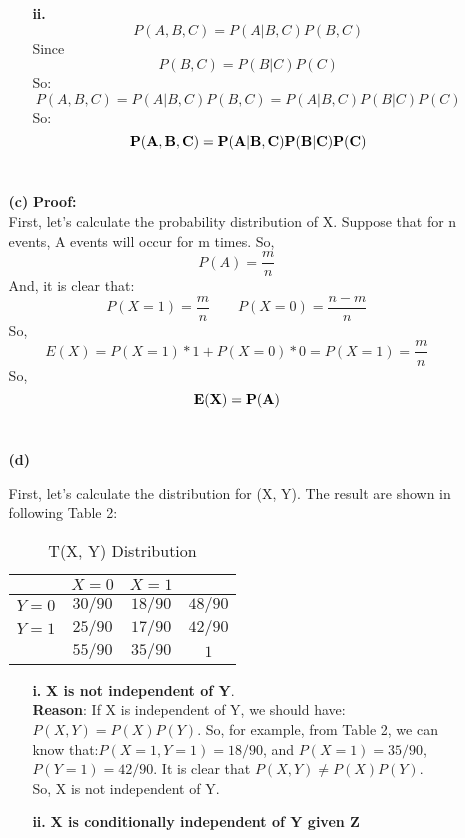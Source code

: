 \begin{enumerate}
\begin{enumerate}
\begin{enumerate}
\item[{\bf ii. }]
$$P(A, B, C) = P(A|B, C)P(B, C)$$
Since $$P(B, C) = P(B|C)P(C)$$
So: $$P(A, B, C) = P(A|B, C)P(B, C) = P(A|B, C)P(B|C)P(C)$$
So:
$${\bf P(A, B, C) = P(A|B, C)P(B|C)P(C)}$$\\

\end{enumerate}

\item[{\bf (c)}]
{\bf Proof:}\\
First, let's calculate the probability distribution of X. Suppose that for n events, A events will occur for m times. So, $$P(A) = \frac{m}{n}$$
And, it is clear that:
$$P(X=1) = \frac{m}{n} \qquad P(X=0) = \frac{n-m}{n}$$
So, $$E(X) = P(X=1)*1 + P(X=0)*0 = P(X=1) = \frac{m}{n}$$
So, $${\bf E(X) = P(A)}$$\\

\item[{\bf (d)}]

First, let's calculate the distribution for (X, Y). The result are shown in following Table 2:\\

	\begin{table}[H]
		\centering
		\begin{tabular}{|c|c|c|c|}
			\hline 
			& $X = 0$ & $X = 1$ &\\ 
			\hline 
			$Y = 0$ & $30/90$ &  $18/90$ & $48/90$ \\ 
			\hline 
			$Y = 1$ & $25/90$ &  $17/90$ & $42/90$ \\ 
			\hline 
			 & $55/90$ &  $35/90$ & $1$ \\ 
			\hline 
		\end{tabular}
		\caption{T(X, Y) Distribution \label{table:lltu}}
	\end{table}
\begin{enumerate}
\item[{\bf i. }]
{\bf X is not independent of Y}.\\

{\bf Reason}: If X is independent of Y, we should have: $P(X, Y) = P(X)P(Y)$. So, for example, from Table 2, we can know that:$P(X=1, Y=1) = 18/90$, and $P(X = 1) = 35/90$, $P(Y=1) = 42/90$. It is clear that $P(X, Y) \neq P(X)P(Y)$.\\

So, X is not independent of Y.\\

\item[{\bf ii. }] {\bf X is conditionally independent of Y given Z}\\


\end{enumerate}
\end{enumerate}
\end{enumerate}
